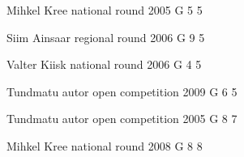 \documentclass[11pt]{article}
\begin{document}
\ylDisplay{} %
{Mihkel Kree} %
{national round} %
{2005} %
{G 5} %
{5} %
{

\ifEngSolution
\fi
}

\ylDisplay{} %
{Siim Ainsaar} %
{regional round} %
{2006} %
{G 9} %
{5} %
{

\ifEngSolution
\fi
}

\ylDisplay{} %
{Valter Kiisk} %
{national round} %
{2006} %
{G 4} %
{5} %
{

\ifEngSolution
\fi
}

\ylDisplay{} %
{Tundmatu autor} %
{open competition} %
{2009} %
{G 6} %
{5} %
{

\ifEngSolution
\fi
}

\ylDisplay{} %
{Tundmatu autor} %
{open competition} %
{2005} %
{G 8} %
{7} %
{

\ifEngSolution
\fi
}

\ylDisplay{} %
{Mihkel Kree} %
{national round} %
{2008} %
{G 8} %
{8} %
{

\ifEngSolution
\fi
}
\newpage
\end{document}
